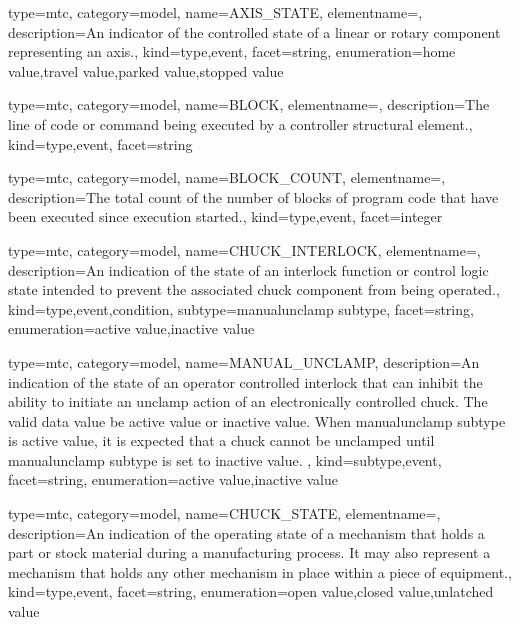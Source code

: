 {
  type=mtc,
  category=model,
  name={AXIS\_STATE},
  elementname=,
  description={An indicator of the controlled state of a \gls{linear} or \gls{rotary} component representing an axis.},
  kind={type,event},
  facet={\gls{string}},
  enumeration={\gls{home value},\gls{travel value},\gls{parked value},\gls{stopped value}}
}


{
  type=mtc,
  category=model,
  name={BLOCK},
  elementname=,
  description={The line of code or command being executed by a \gls{controller} \gls{structural element}.},
  kind={type,event},
  facet={\gls{string}}
}


{
  type=mtc,
  category=model,
  name={BLOCK\_COUNT},
  elementname=,
  description={The total count of the number of blocks of program code that have been executed since execution started.},
  kind={type,event},
  facet={\gls{integer}}
}


{
  type=mtc,
  category=model,
  name={CHUCK\_INTERLOCK},
  elementname=,
  description={An indication of the state of an interlock function or control logic state intended to prevent the associated \gls{chuck} component from being operated.},
  kind={type,event,condition},
  subtype={\gls{manualunclamp subtype}},
  facet={\gls{string}},
  enumeration={\gls{active value},\gls{inactive value}}
}


{
  type=mtc,
  category=model,
  name={MANUAL\_UNCLAMP},
  description={An indication of the state of an operator controlled interlock that can inhibit the ability to initiate an unclamp action of an electronically controlled chuck.  The \gls{valid data value} \must be \gls{active value} or \gls{inactive value}. \newline When \gls{manualunclamp subtype} is \gls{active value}, it is expected that a chuck cannot be unclamped until \gls{manualunclamp subtype} is set to \gls{inactive value}. },
  kind={subtype,event},
  facet={\gls{string}},
  enumeration={\gls{active value},\gls{inactive value}}
}


{
  type=mtc,
  category=model,
  name={CHUCK\_STATE},
  elementname=,
  description={An indication of the operating state of a mechanism that holds a part or stock material during a manufacturing process. It may also represent a mechanism that holds any other mechanism in place within a piece of equipment.},
  kind={type,event},
  facet={\gls{string}},
  enumeration={\gls{open value},\gls{closed value},\gls{unlatched value}}
}


